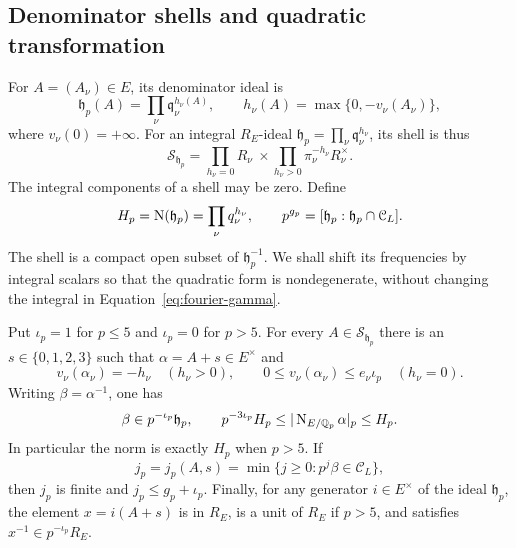 \subsection{Denominator shells and quadratic transformation}

For $A=(A_\nu)\in E$, its denominator ideal is
\[
 \mathfrak h_p(A)=\prod_\nu\mathfrak q_\nu^{h_\nu(A)},\qquad
 h_\nu(A)=\max\{0,-v_\nu(A_\nu)\},
\]
where $v_\nu(0)=+\infty$.  For an integral $R_E$-ideal
$\mathfrak h_p=\prod_\nu\mathfrak q_\nu^{h_\nu}$, its shell is thus
\[
 \mathscr S_{\mathfrak h_p}
 =\prod_{h_\nu=0}R_\nu\ \times\!
  \prod_{h_\nu>0}\pi_\nu^{-h_\nu}R_\nu^\times.
\]
The integral components of a shell may be zero.  Define
\begin{equation}\label{eq:fourier-shell-indices}
 H_p=\operatorname{N}(\mathfrak h_p)=\prod_\nu q_\nu^{h_\nu},\qquad
 p^{g_p}=[\mathfrak h_p:\mathfrak h_p\cap\mathcal C_L].
\end{equation}
The shell is a compact open subset of $\mathfrak h_p^{-1}$.  We shall shift
its frequencies by integral scalars so that the quadratic form is
nondegenerate, without changing the integral in
Equation~\eqref{eq:fourier-gamma}.

\begin{lemma}\label{lem:fourier-shift}
Put $\iota_p=1$ for $p\le5$ and $\iota_p=0$ for $p>5$.  For every
$A\in\mathscr S_{\mathfrak h_p}$ there is an $s\in\{0,1,2,3\}$ such that
$\alpha=A+s\in E^\times$ and
\[
 v_\nu(\alpha_\nu)=-h_\nu\quad(h_\nu>0),\qquad
 0\le v_\nu(\alpha_\nu)\le e_\nu\iota_p\quad(h_\nu=0).
\]
Writing $\beta=\alpha^{-1}$, one has
\begin{equation}\label{eq:fourier-shift-bounds}
 \beta\in p^{-\iota_p}\mathfrak h_p,
 \qquad p^{-3\iota_p}H_p
       \le |\operatorname{N}_{E/\mathbb Q_p}\alpha|_p\le H_p.
\end{equation}
In particular the norm is exactly $H_p$ when $p>5$.  If
\begin{equation}\label{eq:fourier-j-definition}
 j_p=j_p(A,s)=\min\{j\ge0:p^j\beta\in\mathcal C_L\},
\end{equation}
then $j_p$ is finite and $j_p\le g_p+\iota_p$.  Finally, for any generator
$i\in E^\times$ of the ideal $\mathfrak h_p$, the element $x=i(A+s)$ is in
$R_E$, is a unit of $R_E$ if $p>5$, and satisfies
$x^{-1}\in p^{-\iota_p}R_E$.
\end{lemma}

